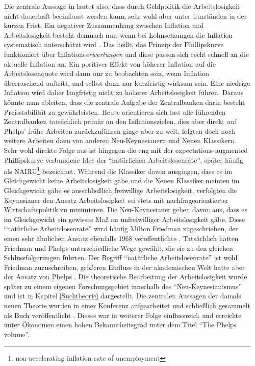 Die zentrale Aussage in \textcite{Phelps1968} lautet also, dass durch Geldpolitik die Arbeitslosigkeit nicht dauerhaft beeinflusst werden kann, sehr wohl aber unter Umständen in der kurzen Frist. Ein negativer Zusammenhang zwischen Inflation und Arbeitslosigkeit besteht demnach nur, wenn bei Lohnsetzungen die Inflation systematisch unterschätzt wird \parencite[S. 248]{Blanchard2003}. Das heißt, das Prinzip der Phillipskurve funktioniert über Inflations\textit{erwartungen} und diese passen sich recht schnell an die aktuelle Inflation an. Ein positiver Effekt von höherer Inflation auf die Arbeitslosenquote wird dann nur zu beobachten sein, wenn Inflation überraschend auftritt, und selbst dann nur kurzfristig wirksam sein. Eine niedrige Inflation wird daher langfristig nicht  zu höherer Arbeitslosigkeit führen\parencite{Phelps1967}. Daraus könnte man ableiten, dass die zentrale Aufgabe der Zentralbanken darin besteht Preisstabilität zu gewährleisten. Heute orientieren sich fast alle führenden Zentralbanken tatsächlich primär an den Inflationszielen, dies aber direkt auf Phelps' frühe Arbeiten zurückzuführen ginge aber zu weit, folgten doch noch weitere Arbeiten dazu von anderen Neu-Keynesianern und Neuen Klassikern.
Sehr wohl direkte Folge aus \textcite{Phelps1968} ist hingegen die eng mit der expectations-augmented Phillipskurve verbundene Idee der "`natürlichen Arbeitslosenrate"', später häufig als NAIRU\footnote{non-accelerating inflation rate of unemployment} bezeichnet. Während die Klassiker davon ausgingen, dass es im Gleichgewicht keine Arbeitslosigkeit gäbe und die Neuen Klassiker meinten im Gleichgewicht gäbe es ausschließlich freiwillige Arbeitslosigkeit, verfolgten die Keynesianer den Ansatz Arbeitslosigkeit sei stets mit nachfrageorientierter Wirtschaftspolitik zu minimieren. Die Neu-Keynesianer gehen davon aus, dass es im Gleichgewicht ein gewisses Maß an unfreiwilliger Arbeitslosigkeit gäbe. Diese "`natürliche Arbeitslosenrate"' wird häufig Milton Friedman zugeschrieben, der einen sehr ähnlichen Ansatz ebenfalls 1968 veröffentlichte \parencite{Friedman1968}. Tatsächlich hatten Friedman und Phelps unterschiedliche Wege gewählt, die sie zu den gleichen Schlussfolgerungen führten. Der Begriff "`natürliche Arbeitslosenrate"' ist wohl Friedman zuzuschreiben, größeren Einfluss in der akademischen Welt hatte aber der Ansatz von Phelps \textcite[S. 9f]{Nobelpreis-Komitee2006}. Die theoretische Bearbeitung der Arbeitslosigkeit wurde später zu einem eigenen Forschungsgebiet innerhalb des "`Neu-Keynesianismus"' und ist in Kapitel \ref{Suchtheorie} dargestellt.
Die zentralen Aussagen der damals neuen Theorie wurden in einer Konferenz aufgearbeitet und schließlich gesammelt als Buch veröffentlicht \textcite{Phelps1970}. Dieses war in weiterer Folge einflussreich und erreichte unter Ökonomen einen hohen Bekanntheitsgrad unter dem Titel "`The Phelps volume"'.

